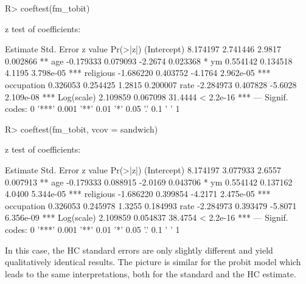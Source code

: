 \documentclass{Z}
\begin{document}
\begin{Schunk}
\begin{Sinput}
R> coeftest(fm_tobit)
\end{Sinput}
\begin{Soutput}
z test of coefficients:

             Estimate Std. Error z value  Pr(>|z|)    
(Intercept)  8.174197   2.741446  2.9817  0.002866 ** 
age         -0.179333   0.079093 -2.2674  0.023368 *  
ym           0.554142   0.134518  4.1195 3.798e-05 ***
religious   -1.686220   0.403752 -4.1764 2.962e-05 ***
occupation   0.326053   0.254425  1.2815  0.200007    
rate        -2.284973   0.407828 -5.6028 2.109e-08 ***
Log(scale)   2.109859   0.067098 31.4444 < 2.2e-16 ***
---
Signif. codes:  0 '***' 0.001 '**' 0.01 '*' 0.05 '.' 0.1 ' ' 1 
\end{Soutput}
\begin{Sinput}
R> coeftest(fm_tobit, vcov = sandwich)
\end{Sinput}
\begin{Soutput}
z test of coefficients:

             Estimate Std. Error z value  Pr(>|z|)    
(Intercept)  8.174197   3.077933  2.6557  0.007913 ** 
age         -0.179333   0.088915 -2.0169  0.043706 *  
ym           0.554142   0.137162  4.0400 5.344e-05 ***
religious   -1.686220   0.399854 -4.2171 2.475e-05 ***
occupation   0.326053   0.245978  1.3255  0.184993    
rate        -2.284973   0.393479 -5.8071 6.356e-09 ***
Log(scale)   2.109859   0.054837 38.4754 < 2.2e-16 ***
---
Signif. codes:  0 '***' 0.001 '**' 0.01 '*' 0.05 '.' 0.1 ' ' 1 
\end{Soutput}
\end{Schunk}

In this case, the HC standard errors are only slightly different and yield
qualitatively identical results. The picture is similar for the probit model
which leads to the same interpretations, both for the standard and the HC 
estimate.
\end{document}
